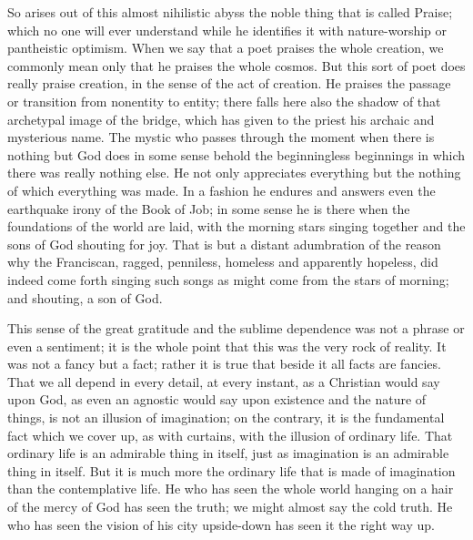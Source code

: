 \documentclass{book}
\begin{document}
So arises out of this almost nihilistic abyss the noble thing that is called Praise; which no one will ever understand while he identifies it with nature-worship or pantheistic optimism. When we say that a poet praises the whole creation, we commonly mean only that he praises the whole cosmos. But this sort of poet does really praise creation, in the sense of the act of creation. He praises the passage or transition from nonentity to entity; there falls here also the shadow of that archetypal image of the bridge, which has given to the priest his archaic and mysterious name. The mystic who passes through the moment when there is nothing but God does in some sense behold the beginningless beginnings in which there was really nothing else. He not only appreciates everything but the nothing of which everything was made. In a fashion he endures and answers even the earthquake irony of the Book of Job; in some sense he is there when the foundations of the world are laid, with the morning stars singing together and the sons of God shouting for joy. That is but a distant adumbration of the reason why the Franciscan, ragged, penniless, homeless and apparently hopeless, did indeed come forth singing such songs as might come from the stars of morning; and shouting, a son of God.

This sense of the great gratitude and the sublime dependence was not a phrase or even a sentiment; it is the whole point that this was the very rock of reality. It was not a fancy but a fact; rather it is true that beside it all facts are fancies. That we all depend in every detail, at every instant, as a Christian would say upon God, as even an agnostic would say upon existence and the nature of things, is not an illusion of imagination; on the contrary, it is the fundamental fact which we cover up, as with curtains, with the illusion of ordinary life. That ordinary life is an admirable thing in itself, just as imagination is an admirable thing in itself. But it is much more the ordinary life that is made of imagination than the contemplative life. He who has seen the whole world hanging on a hair of the mercy of God has seen the truth; we might almost say the cold truth. He who has seen the vision of his city upside-down has seen it the right way up.
\end{document}
